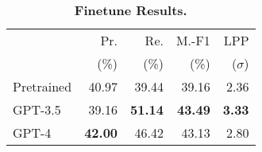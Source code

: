 \begin{table}[!ht]
\centering
\caption{\textbf{Finetune Results.}}
\label{tab:finetune-results}
\begin{tabular}{lrrrr}
\toprule
 & Pr. & Re. & M.-F1 & LPP \\
 & (\%) & (\%) & (\%) & ($\sigma$) \\
\midrule
Pretrained & 40.97 & 39.44 & 39.16 & 2.36 \\
GPT-3.5 & 39.16 & \textbf{51.14} & \textbf{43.49} & \textbf{3.33} \\
GPT-4 & \textbf{42.00} & 46.42 & 43.13 & 2.80 \\
\bottomrule
\end{tabular}
\end{table}
